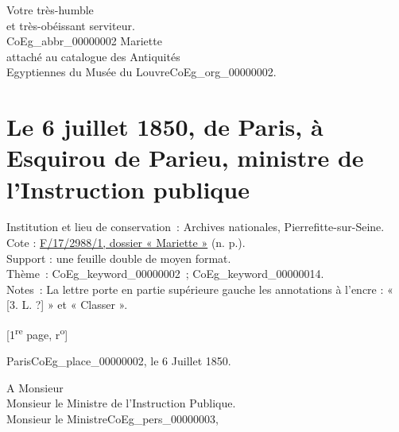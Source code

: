 \documentclass{book}
\begin{document}
\begin{center}\hspace{5cm}Votre très-humble\\
\hspace{5cm}et très-obéissant serviteur.\\
\hspace{5cm}\gls{CoEg_abbr_00000002} Mariette\\
\hspace{5cm}attaché au catalogue des Antiquités\\
\hspace{5cm}Egyptiennes du Musée du Louvre\gls{CoEg_org_00000002}.\end{center}

\hypertarget{CoEg_Mariette_1850-07-06}{}

\section*{Le 6 juillet 1850, de Paris, à Esquirou de Parieu, ministre de l’Instruction publique}
 \label{labCoEg_Mariette_1850-07-06}
{\footnotesize
\noindent Institution et lieu de conservation~: Archives nationales, Pierrefitte-sur-Seine.\\
Cote : \hyperlink{CoEg_Mariette_ms_002}{F/17/2988/1, dossier « Mariette »} (n. p.).\\
Support : une feuille double de moyen format.\\
Thème~: \gls{CoEg_keyword_00000002}~; \gls{CoEg_keyword_00000014}.\\
Notes~: La lettre porte en partie supérieure gauche les annotations à l’encre  : « [3. L. ?] » et « Classer ».}

{\footnotesize \begin{center} {[1\textsuperscript{re} page, r\textsuperscript{o}]}\end{center}}
\begin{flushright}Paris\gls{CoEg_place_00000002}, le 6 Juillet 1850.\end{flushright}

\indent A Monsieur\\
\indent \hspace{1cm} Monsieur le Ministre de l’Instruction Publique.\\

\hspace{1cm} Monsieur le Ministre\gls{CoEg_pers_00000003},\\
\end{document}
